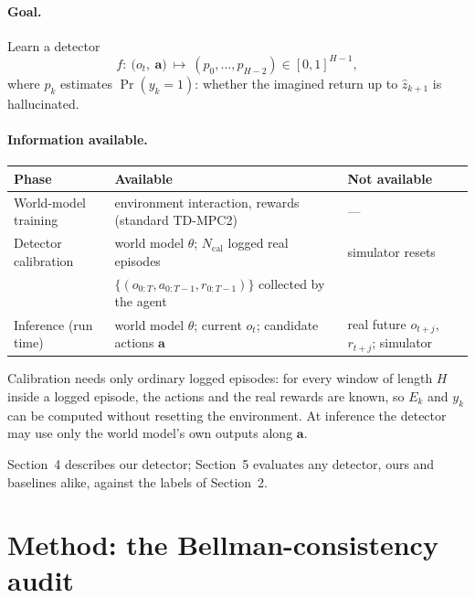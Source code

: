 \documentclass[11pt]{article}
\begin{document}
\paragraph{Goal.}
Learn a detector
\[
f:\ \bigl(o_t,\ \mathbf a\bigr)\ \longmapsto\ (p_0,\dots,p_{H-2})\in[0,1]^{H-1},
\]
where $p_k$ estimates $\Pr(y_k=1)$: whether the imagined return up to $\hat z_{k+1}$ is hallucinated.

\paragraph{Information available.}
\begin{center}
\begin{tabular}{@{}lll@{}}
\toprule
Phase & Available & Not available\\
\midrule
World-model training & environment interaction, rewards (standard TD-MPC2) & --- \\
Detector calibration & world model $\theta$; $N_{\text{cal}}$ logged real episodes & simulator resets\\
 & $\{(o_{0:T},a_{0:T-1},r_{0:T-1})\}$ collected by the agent & \\
Inference (run time) & world model $\theta$; current $o_t$; candidate actions $\mathbf a$ & real future $o_{t+j}$, $r_{t+j}$; simulator\\
\bottomrule
\end{tabular}
\end{center}
Calibration needs only ordinary logged episodes: for every window of length $H$ inside a logged episode,
the actions and the real rewards are known, so $E_k$ and $y_k$ can be computed without resetting the environment.
At inference the detector may use only the world model's own outputs along $\mathbf a$.

Section~4 describes our detector; Section~5 evaluates any detector, ours and baselines alike, against the
labels of Section~2.

\section{Method: the Bellman-consistency audit}
\end{document}
